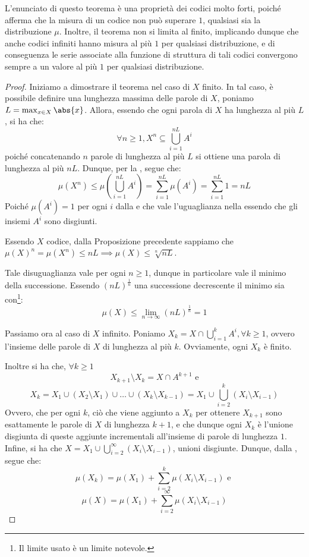 L'enunciato di questo teorema è una proprietà dei codici molto forti, poiché afferma che la misura di un codice non può superare \(1\), qualsiasi sia la distribuzione \(\mu\).
Inoltre, il teorema non si limita al finito, implicando dunque che anche codici infiniti hanno misura al più \(1\) per qualsiasi distribuzione, e di conseguenza le serie associate alla funzione di struttura di tali codici convergono sempre a un valore al più \(1\) per qualsiasi distribuzione.
\begin{proof}
  Iniziamo a dimostrare il teorema nel caso di \(X\) finito.
  In tal caso, è possibile definire una lunghezza massima delle parole di \(X\), poniamo \(L = \max_{x \in X} \abs{x}\).
  Allora, essendo che ogni parola di \(X\) ha lunghezza al più \(L\), si ha che:
  \[\forall n \geq 1, X^n \subseteq \bigcup_{i=1}^{nL} A^i\]
  poiché concatenando \(n\) parole di lunghezza al più \(L\) si ottiene una parola di lunghezza al più \(nL\).
  Dunque, per la , segue che:
  \[\mu(X^n) \leq \mu(\bigcup_{i=1}^{nL} A^i) = \sum_{i=1}^{nL} \mu(A^i) = \sum_{i=1}^{nL} 1 = nL\]
  Poiché \(\mu(A^i) = 1\) per ogni \(i\) dalla  e che vale l'uguaglianza nella  essendo che gli insiemi \(A^i\) sono disgiunti.

  Essendo \(X\) codice, dalla Proposizione precedente sappiamo che \({\mu(X)}^n = \mu(X^n) \leq nL \implies \mu(X) \leq \sqrt[n]{nL}\).

  Tale disuguaglianza vale per ogni \(n \geq 1\), dunque in particolare vale il minimo della successione.
  Essendo \({(nL)}^{\frac{1}{n}}\) una successione decrescente il minimo sia con\footnote{Il limite usato è un limite notevole.}:
  \[\mu(X) \leq \lim_{n \to \infty} {(nL)}^{\frac{1}{n}} = 1\]

  Passiamo ora al caso di \(X\) infinito.
  Poniamo \(X_k = X \cap \bigcup_{i=1}^{k} A^i, \forall k \geq 1\), ovvero l'insieme delle parole di \(X\) di lunghezza al più \(k\).
  Ovviamente, ogni \(X_k\) è finito.

  Inoltre si ha che, \(\forall k \geq 1\)
  \[X_{k+1}\setminus X_k = X \cap A^{k+1} \text{ e}\]
  \[X_k = X_1 \cup (X_2 \setminus X_1) \cup \ldots \cup (X_k \setminus X_{k-1}) = X_1 \cup \bigcup_{i=2}^{k} (X_i \setminus X_{i-1})\]
  Ovvero, che per ogni \(k\), ciò che viene aggiunto a \(X_k\) per ottenere \(X_{k+1}\) sono esattamente le parole di \(X\) di lunghezza \(k+1\), e che dunque ogni \(X_k\) è l'unione disgiunta di queste aggiunte incrementali all'insieme di parole di lunghezza \(1\).
  Infine, si ha che \(X = X_1 \cup \bigcup_{i=2}^{\infty} (X_i \setminus X_{i-1})\), unioni disgiunte.
  Dunque, dalla , segue che:
  \[\mu(X_k) = \mu(X_1) + \sum_{i=2}^{k} \mu(X_i \setminus X_{i-1}) \text{ e }\]
  \[\mu(X) = \mu(X_1) + \sum_{i=2}^{\infty} \mu(X_i \setminus X_{i-1})\]


\end{proof}
